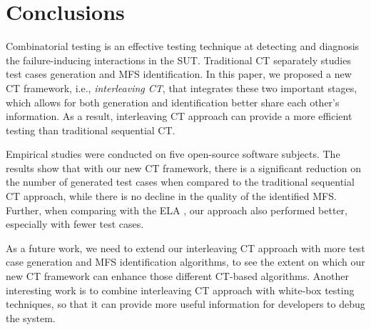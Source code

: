 \documentclass{sig-alternate}
\begin{document}
\section{Conclusions}
Combinatorial testing is an effective testing technique at detecting and diagnosis the failure-inducing interactions in the SUT. Traditional CT separately studies test cases generation and MFS identification. In this paper, we proposed a new CT framework, i.e., \emph{interleaving CT}, that integrates these two important stages, which allows for both generation and identification better share each other's information. As a result, interleaving CT approach can provide a more efficient testing than traditional sequential CT.

Empirical studies were conducted on five open-source software subjects. The results show that with our new CT framework, there is a significant reduction on the number of generated test cases when compared to the traditional sequential CT approach, while there is no decline in the quality of the identified MFS. Further, when comparing with the ELA \cite{martinez2009locating,martinez2008algorithms}, our approach also performed better, especially with fewer test cases.

As a future work, we need to extend our interleaving CT approach with more test case generation and MFS identification algorithms, to see the extent on which our new CT framework can enhance those different CT-based algorithms. Another interesting work is to combine interleaving CT approach with white-box testing techniques, so that it can provide more useful information for developers to debug the system.




%

%
%
%
\end{document}

